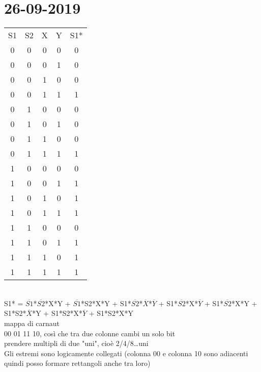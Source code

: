 \documentclass[10pt]{report}
\begin{document}
\section{26-09-2019}
\begin{tabular}{cccc|c}
S1 & S2 & X & Y & S1* \\
0 & 0 & 0 & 0 & 0\\
0 & 0 & 0 & 1 & 0\\
0 & 0 & 1 & 0 & 0\\
0 & 0 & 1 & 1 & 1\\
0 & 1 & 0 & 0 & 0\\
0 & 1 & 0 & 1 & 0\\
0 & 1 & 1 & 0 & 0\\
0 & 1 & 1 & 1 & 1\\
1 & 0 & 0 & 0 & 0\\
1 & 0 & 0 & 1 & 1\\
1 & 0 & 1 & 0 & 1\\
1 & 0 & 1 & 1 & 1\\
1 & 1 & 0 & 0 & 0\\
1 & 1 & 0 & 1 & 1\\
1 & 1 & 1 & 0 & 1\\
1 & 1 & 1 & 1 & 1\\
\end{tabular}\\
S1* = $\overline{S1}$*$\overline{S2}$*X*Y + $\overline{S1}$*S2*X*Y + S1*$\overline{S2}$*$\overline{X}$*$\overline{Y}$ + S1*$\overline{S2}$*X*$\overline{Y}$ + S1*$\overline{S2}$*X*Y + S1*S2*$\overline{X}$*Y + S1*S2*X*$\overline{Y}$ + S1*S2*X*Y\\
mappa di carnaut\\
00 01 11 10, così che tra due colonne cambi un solo bit\\
prendere multipli di due "uni", cioè 2/4/8\ldots uni\\
Gli estremi sono logicamente collegati (colonna 00 e colonna 10 sono adiacenti quindi posso formare rettangoli anche tra loro)
\end{document}
